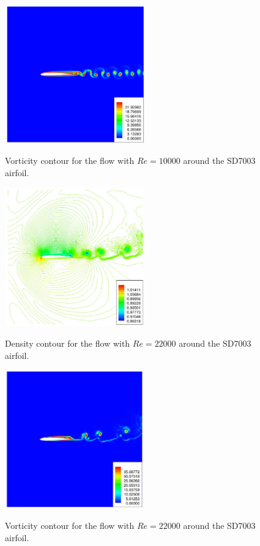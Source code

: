 \begin{figure}
\centering
\includegraphics[height=60mm]{figure_935b} \\
\caption{Vorticity contour for the flow with $Re = 10000$ around the SD7003 airfoil.}
\label{fig:figure_935b}
\end{figure}

\begin{figure}
\centering
\includegraphics[height=60mm]{figure_936a} \\
\caption{Density contour for the flow with $Re = 22000$ around the SD7003 airfoil.}
\label{fig:figure_936a}
\end{figure}

\begin{figure}
\centering
\includegraphics[height=60mm]{figure_936b} \\
\caption{Vorticity contour for the flow with $Re = 22000$ around the SD7003 airfoil.}
\label{fig:figure_936b}
\end{figure}

